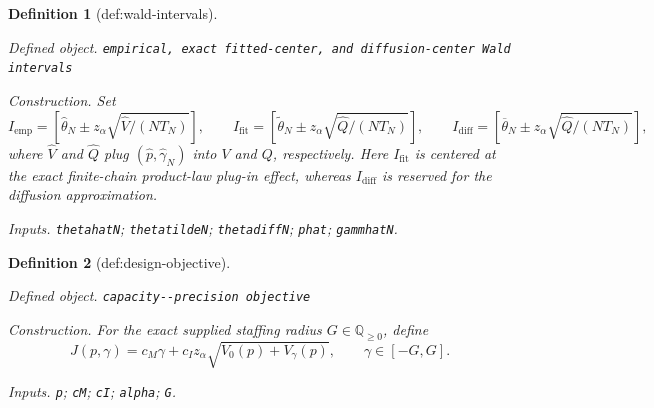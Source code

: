\documentclass{article}
\newtheorem{definition}{Definition}
\begin{document}
\begin{definition}[def:wald-intervals]\label{def:wald-intervals}
\par\smallskip\noindent\emph{Defined object.} \texttt{empirical,\allowbreak{} exact fitted-\allowbreak{}center,\allowbreak{} and diffusion-\allowbreak{}center Wald intervals}
\par\smallskip\noindent\emph{Construction.} Set
\[
 I_{\mathrm{emp}}=[\widehat\theta_N\pm z_\alpha\sqrt{\widehat V/(NT_N)}],
 \qquad
 I_{\mathrm{fit}}=[\widetilde\theta_N\pm z_\alpha\sqrt{\widehat Q/(NT_N)}],
 \qquad
 I_{\mathrm{diff}}=[\overline\theta_N\pm z_\alpha\sqrt{\widehat Q/(NT_N)}],
\]
where \(\widehat V\) and \(\widehat Q\) plug \((\widehat p,\widehat\gamma_N)\) into \(V\) and \(Q\), respectively.  Here \(I_{\mathrm{fit}}\) is centered at the exact finite-chain product-law plug-in effect, whereas \(I_{\mathrm{diff}}\) is reserved for the diffusion approximation.
\par\smallskip\noindent\emph{Inputs.} \texttt{thetahatN}; \texttt{thetatildeN}; \texttt{thetadiffN}; \texttt{phat}; \texttt{gammhatN}.
\end{definition}

\begin{definition}[def:design-objective]\label{def:design-objective}
\par\smallskip\noindent\emph{Defined object.} \texttt{capacity-\allowbreak{}-\allowbreak{}precision objective}
\par\smallskip\noindent\emph{Construction.} For the exact supplied staffing radius \(G\in\mathbb Q_{\geq0}\), define
\[
 J(p,\gamma)=c_M\gamma+c_Iz_\alpha\sqrt{V_0(p)+V_\gamma(p)},
 \qquad \gamma\in[-G,G].
\]
\par\smallskip\noindent\emph{Inputs.} \texttt{p}; \texttt{cM}; \texttt{cI}; \texttt{alpha}; \texttt{G}.
\end{definition}
\end{document}
